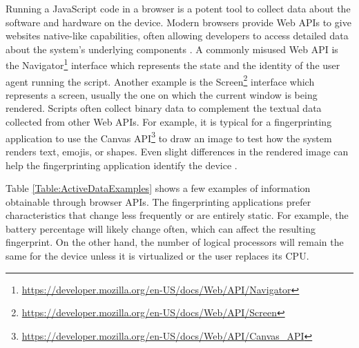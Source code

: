 \medbreak

Running a JavaScript code in a browser is a potent tool to collect data about the software and hardware on the device. Modern browsers provide Web APIs to give websites native-like capabilities, often allowing developers to access detailed data about the system's underlying components \cite{VondracekDP}. A commonly misused Web API is the Navigator\footnote{\url{https://developer.mozilla.org/en-US/docs/Web/API/Navigator}} interface which represents the state and the identity of the user agent running the script. Another example is the Screen\footnote{\url{https://developer.mozilla.org/en-US/docs/Web/API/Screen}} interface which represents a screen, usually the one on which the current window is being rendered. Scripts often collect binary data to complement the textual data collected from other Web APIs. For example, it is typical for a fingerprinting application to use the Canvas API\footnote{\url{https://developer.mozilla.org/en-US/docs/Web/API/Canvas_API}} to draw an image to test how the system renders text, emojis, or shapes. Even slight differences in the rendered image can help the fingerprinting application identify the device \cite{VondracekDP}.

Table \ref{Table:ActiveDataExamples} shows a few examples of information obtainable through browser APIs. The fingerprinting applications prefer characteristics that change less frequently or are entirely static. For example, the battery percentage will likely change often, which can affect the resulting fingerprint. On the other hand, the number of logical processors will remain the same for the device unless it is virtualized or the user replaces its CPU.

